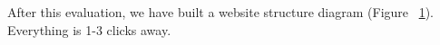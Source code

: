 \documentclass{l3proj}
\begin{document}
After this evaluation, we have built a website structure diagram
(Figure ~\ref{fig:website-structure}). Everything is 1-3 clicks away.
\begin{figure}[H]
\label{fig:website-structure}
	\vspace{-20pt} %
	\begin{center}
		

\end{center}
\end{figure}
\end{document}
